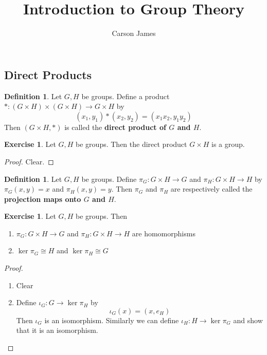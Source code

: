 \documentclass[12pt]{amsart}
\theoremstyle{definition}
\newtheorem{defn}[definition]{Definition}
\newtheorem{ex}[definition]{Exercise}
\newcommand{\lex}[1]{\label{ex:#1}}
\begin{document}
	
	\title{Introduction to Group Theory}
	\author{Carson James}
	\maketitle
	
	\tableofcontents
	
	\newpage
	
	
	\subsection{Direct Products}
	
	\begin{defn}
	Let $G,H$ be groups. Define a product $*:(G \times H) \times (G \times H) \rightarrow G \times H$ by 
	$$(x_1,y_1) * (x_2, y_2) = (x_1x_2, y_1y_2)$$
	Then $(G \times H, *)$ is called the \textbf{direct product of $G$ and $H$}.
	\end{defn}	
	
	\begin{ex}
	\lex{1} Let $G,H$ be groups. Then the direct product $G \times H$ is a group.
	\end{ex}
	\begin{proof}
	Clear.
	\end{proof}
	
	\begin{defn} 
	Let $G,H$ be groups. Define $\pi_G :G \times H \rightarrow G$ and $\pi_H :G \times H \rightarrow H$ by $\pi_G(x,y) = x$ and $\pi_H(x,y) = y$.  Then $\pi_G$ and $\pi_H$ are respectively called the \textbf{projection maps onto $G$ and $H$}.
	\end{defn}	
	
	\begin{ex}
	\lex{2} Let $G,H$ be groups. Then 
	\begin{enumerate}
	\item $\pi_G: G \times H \rightarrow G$ and $\pi_H : G \times H \rightarrow H$ are homomorphisms
	\item $\ker \pi_G \cong H$ and $\ker \pi_H \cong G$
\end{enumerate}	 
	\end{ex}
	
	\begin{proof}
	\begin{enumerate}
	\item Clear
	\item Define $\iota_G:G \rightarrow \ker \pi_H$ by $$\iota_G(x) = (x, e_H)$$ Then $\iota_G$ is an isomorphism. Similarly we can define $\iota_H:H \rightarrow \ker \pi_G$ and show that it is an isomorphism.
	\end{enumerate}
	\end{proof}
	
\end{document}
